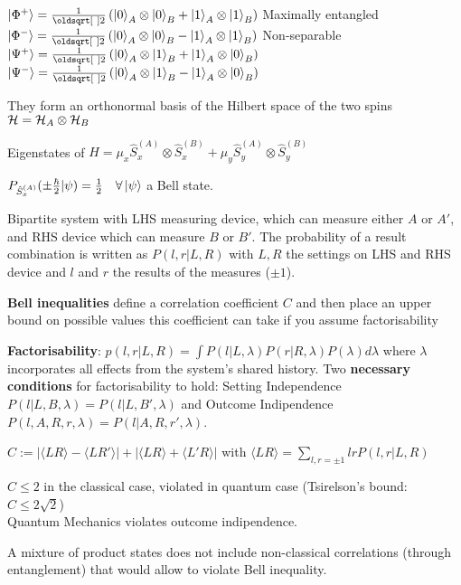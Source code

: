 \begin{squishlist}
    \item $\ket{\Phi^+} = \frac{1}{\sqrt{2}} \left( \ket{0}_A \otimes \ket{0}_B + \ket{1}_A \otimes \ket{1}_B\right)$ \hfill Maximally entangled\\
          $\ket{\Phi^-} = \frac{1}{\sqrt{2}} \left( \ket{0}_A \otimes \ket{0}_B - \ket{1}_A \otimes \ket{1}_B\right)$ \hfill Non-separable\\
          $\ket{\Psi^+} = \frac{1}{\sqrt{2}} \left( \ket{0}_A \otimes \ket{1}_B + \ket{1}_A \otimes \ket{0}_B\right)$ \\
          $\ket{\Psi^-} = \frac{1}{\sqrt{2}} \left( \ket{0}_A \otimes \ket{1}_B - \ket{1}_A \otimes \ket{0}_B\right)$
    \item They form an orthonormal basis of the Hilbert space of the two spins $\mathcal{H} = \mathcal{H}_A \otimes \mathcal{H}_B$
    \item Eigenstates of $\hat{H} = \mu_x \hat{S}_x^{(A)} \otimes \hat{S}_x^{(B)} + \mu_y \hat{S}_y^{(A)} \otimes \hat{S}_y^{(B)}$
    \item $P_{\hat{S}_x^{(A)}}(\pm \frac{\hbar}{2} | \psi) = \frac{1}{2} \quad \forall \ket{\psi} $ a Bell state. 
\end{squishlist}


\begin{squishlist}
    \item Bipartite system with LHS measuring device, which can measure either $A$ or $A'$, and RHS device which can measure $B$ or $B'$.
    The probability of a result combination is written as $P(l,r|L,R)$ with $L,R$ the settings on LHS and RHS device and $l$ and $r$ the results of the measures ($\pm 1$).
    \item \textbf{Bell inequalities} define a correlation coefficient $C$ and then place an upper bound on possible values this coefficient can take if you assume factorisability
    \item \textbf{Factorisability}: $p(l,r|L,R) = \int P(l|L,\lambda) P(r|R,\lambda) P(\lambda) d\lambda$ where $\lambda$ incorporates all effects from the system's shared history.
    Two \textbf{necessary conditions} for factorisability to hold: Setting Independence $P(l|L,B,\lambda) = P(l|L,B',\lambda)$ and Outcome Indipendence $P(l,A,R,r,\lambda) = P(l|A,R,r',\lambda)$.
    \item $C:= |\langle LR \rangle - \langle LR'\rangle  | + |\langle LR\rangle + \langle L'R \rangle |$ with $\langle LR \rangle = \sum_{l,r=\pm 1}lr P(l,r|L,R)$
    \item $C \leq 2$ in the classical case, violated in quantum case (Tsirelson's bound: $C \leq 2\sqrt{2}$) \\ Quantum Mechanics violates outcome indipendence.
    \item A mixture of product states does not include non-classical correlations (through entanglement) that would allow to violate Bell inequality.
\end{squishlist}


